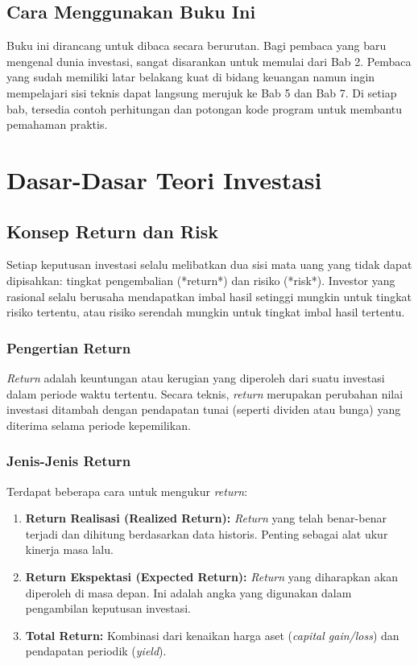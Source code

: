 \documentclass[12pt,a4paper]{book}
\begin{document}
\section{Cara Menggunakan Buku Ini}
Buku ini dirancang untuk dibaca secara berurutan. Bagi pembaca yang baru mengenal dunia investasi, sangat disarankan untuk memulai dari Bab 2. Pembaca yang sudah memiliki latar belakang kuat di bidang keuangan namun ingin mempelajari sisi teknis dapat langsung merujuk ke Bab 5 dan Bab 7. Di setiap bab, tersedia contoh perhitungan dan potongan kode program untuk membantu pemahaman praktis.

\chapter{Dasar-Dasar Teori Investasi}

\section{Konsep Return dan Risk}
Setiap keputusan investasi selalu melibatkan dua sisi mata uang yang tidak dapat dipisahkan: tingkat pengembalian (*return*) dan risiko (*risk*). Investor yang rasional selalu berusaha mendapatkan imbal hasil setinggi mungkin untuk tingkat risiko tertentu, atau risiko serendah mungkin untuk tingkat imbal hasil tertentu.

\subsection{Pengertian Return}
\textit{Return} adalah keuntungan atau kerugian yang diperoleh dari suatu investasi dalam periode waktu tertentu. Secara teknis, \textit{return} merupakan perubahan nilai investasi ditambah dengan pendapatan tunai (seperti dividen atau bunga) yang diterima selama periode kepemilikan.

\subsection{Jenis-Jenis Return}
Terdapat beberapa cara untuk mengukur \textit{return}:
\begin{enumerate}
    \item \textbf{Return Realisasi (Realized Return):} \textit{Return} yang telah benar-benar terjadi dan dihitung berdasarkan data historis. Penting sebagai alat ukur kinerja masa lalu.
    \item \textbf{Return Ekspektasi (Expected Return):} \textit{Return} yang diharapkan akan diperoleh di masa depan. Ini adalah angka yang digunakan dalam pengambilan keputusan investasi.
    \item \textbf{Total Return:} Kombinasi dari kenaikan harga aset (\textit{capital gain/loss}) dan pendapatan periodik (\textit{yield}).
\end{enumerate}
\end{document}

